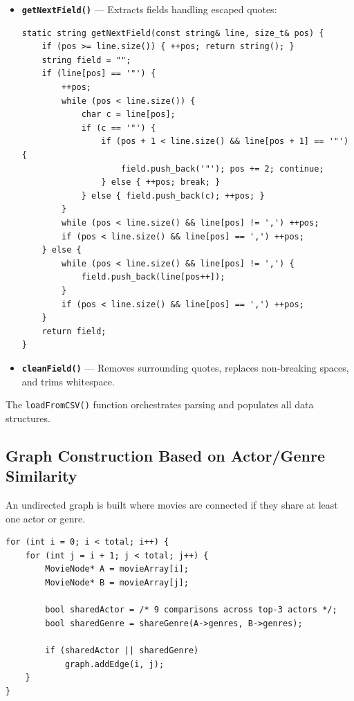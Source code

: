 \documentclass[conference]{IEEEtran}
\begin{document}
\begin{itemize}
    \item \textbf{\texttt{getNextField()}} — Extracts fields handling escaped quotes:
\begin{lstlisting}[caption={getNextField() — Core CSV field extractor}]
static string getNextField(const string& line, size_t& pos) {
    if (pos >= line.size()) { ++pos; return string(); }
    string field = "";
    if (line[pos] == '"') {
        ++pos;
        while (pos < line.size()) {
            char c = line[pos];
            if (c == '"') {
                if (pos + 1 < line.size() && line[pos + 1] == '"') {
                    field.push_back('"'); pos += 2; continue;
                } else { ++pos; break; }
            } else { field.push_back(c); ++pos; }
        }
        while (pos < line.size() && line[pos] != ',') ++pos;
        if (pos < line.size() && line[pos] == ',') ++pos;
    } else {
        while (pos < line.size() && line[pos] != ',') {
            field.push_back(line[pos++]);
        }
        if (pos < line.size() && line[pos] == ',') ++pos;
    }
    return field;
}
\end{lstlisting}

    \item \textbf{\texttt{cleanField()}} — Removes surrounding quotes, replaces non-breaking spaces, and trims whitespace.
\end{itemize}

The \texttt{loadFromCSV()} function orchestrates parsing and populates all data structures.

\subsection{Graph Construction Based on Actor/Genre Similarity}

An undirected graph is built where movies are connected if they share at least one actor or genre.

\begin{lstlisting}[caption={Core of buildGraph() — O(n²) pairwise comparison}]
for (int i = 0; i < total; i++) {
    for (int j = i + 1; j < total; j++) {
        MovieNode* A = movieArray[i];
        MovieNode* B = movieArray[j];

        bool sharedActor = /* 9 comparisons across top-3 actors */;
        bool sharedGenre = shareGenre(A->genres, B->genres);

        if (sharedActor || sharedGenre)
            graph.addEdge(i, j);
    }
}
\end{lstlisting}
\end{document}
